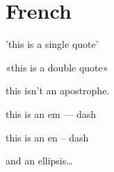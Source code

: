 
\def\mytitle{MultiMarkdown French Test}

\part{French}
\label{french}

'this is a single quote'

«this is a double quote»

this isn't an apostrophe.

this is an em --- dash

this is an en -- dash

and an ellipsis{\ldots}




